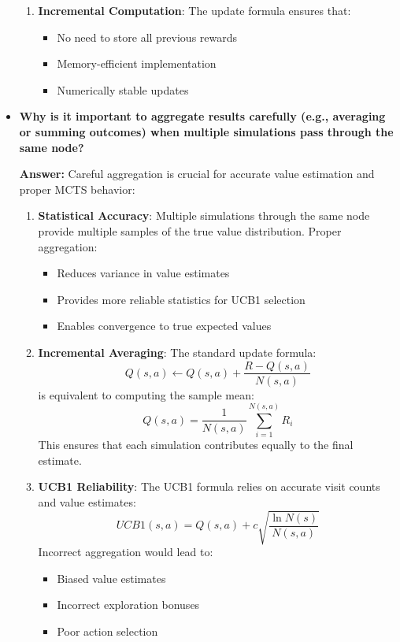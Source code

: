 \begin{itemize}
\begin{enumerate}
        \item \textbf{Incremental Computation}: The update formula ensures that:
        \begin{itemize}
            \item No need to store all previous rewards
            \item Memory-efficient implementation
            \item Numerically stable updates
        \end{itemize}
    \end{enumerate}
    
    \item \textbf{Why is it important to aggregate results carefully (e.g., averaging or summing outcomes) when multiple simulations pass through the same node?}
    
    \textbf{Answer:} Careful aggregation is crucial for accurate value estimation and proper MCTS behavior:
    
    \begin{enumerate}
        \item \textbf{Statistical Accuracy}: Multiple simulations through the same node provide multiple samples of the true value distribution. Proper aggregation:
        \begin{itemize}
            \item Reduces variance in value estimates
            \item Provides more reliable statistics for UCB1 selection
            \item Enables convergence to true expected values
        \end{itemize}
        
        \item \textbf{Incremental Averaging}: The standard update formula:
        \[Q(s,a) \leftarrow Q(s,a) + \frac{R - Q(s,a)}{N(s,a)}\]
        is equivalent to computing the sample mean:
        \[Q(s,a) = \frac{1}{N(s,a)} \sum_{i=1}^{N(s,a)} R_i\]
        This ensures that each simulation contributes equally to the final estimate.
        
        \item \textbf{UCB1 Reliability}: The UCB1 formula relies on accurate visit counts and value estimates:
        \[UCB1(s,a) = Q(s,a) + c\sqrt{\frac{\ln N(s)}{N(s,a)}}\]
        Incorrect aggregation would lead to:
        \begin{itemize}
            \item Biased value estimates
            \item Incorrect exploration bonuses
            \item Poor action selection
        \end{itemize}
        

\end{enumerate}
\end{itemize}
